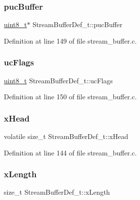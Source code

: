\subsubsection{\texorpdfstring{puc\+Buffer}{pucBuffer}}
{\footnotesize\ttfamily \hyperlink{stdint_8h_aba7bc1797add20fe3efdf37ced1182c5}{uint8\+\_\+t}$\ast$ Stream\+Buffer\+Def\+\_\+t\+::puc\+Buffer}



Definition at line 149 of file stream\+\_\+buffer.\+c.

\mbox{\label{structStreamBufferDef__t_a1afd02d997a1cb3149e3cf203c681d58}} 
\subsubsection{\texorpdfstring{uc\+Flags}{ucFlags}}
{\footnotesize\ttfamily \hyperlink{stdint_8h_aba7bc1797add20fe3efdf37ced1182c5}{uint8\+\_\+t} Stream\+Buffer\+Def\+\_\+t\+::uc\+Flags}



Definition at line 150 of file stream\+\_\+buffer.\+c.

\mbox{\label{structStreamBufferDef__t_a75aafb9fdee8f0666837302bd9b12341}} 
\subsubsection{\texorpdfstring{x\+Head}{xHead}}
{\footnotesize\ttfamily volatile size\+\_\+t Stream\+Buffer\+Def\+\_\+t\+::x\+Head}



Definition at line 144 of file stream\+\_\+buffer.\+c.

\mbox{\label{structStreamBufferDef__t_a6eedf41c877edd42b3b460780d1b6555}} 
\subsubsection{\texorpdfstring{x\+Length}{xLength}}
{\footnotesize\ttfamily size\+\_\+t Stream\+Buffer\+Def\+\_\+t\+::x\+Length}



